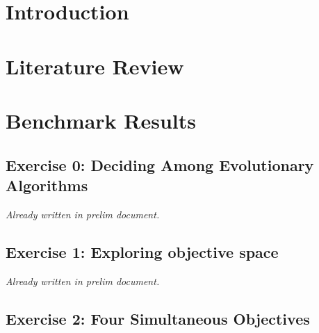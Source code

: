 \chapter{Introduction}
\chapter{Literature Review}
\label{chapter:lit-review}



% 




\chapter{Benchmark Results}


\section{Exercise 0: Deciding Among Evolutionary Algorithms}

\textit{Already written in prelim document.}

\section{Exercise 1: Exploring objective space}

\textit{Already written in prelim document.}

\section{Exercise 2: Four Simultaneous Objectives}

